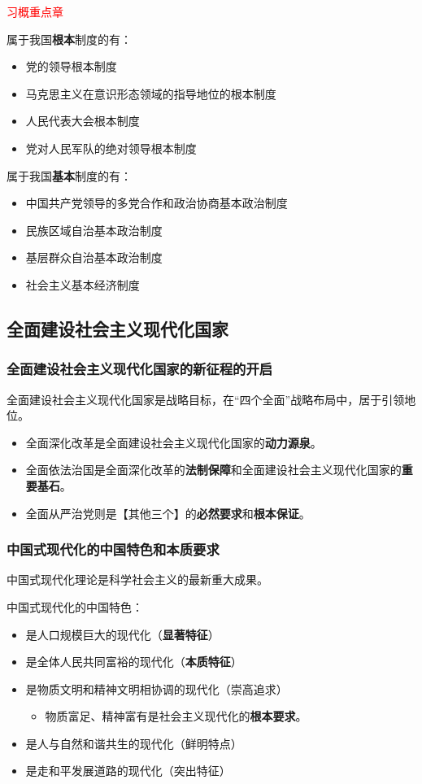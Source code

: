 \documentclass[12pt, a4paper, oneside]{ctexart}
\begin{document}
\textcolor{red}{习概重点章}

属于我国\textbf{根本}制度的有：
\begin{itemize}
  \item 党的领导根本制度
  \item 马克思主义在意识形态领域的指导地位的根本制度
  \item 人民代表大会根本制度
  \item 党对人民军队的绝对领导根本制度
\end{itemize}

属于我国\textbf{基本}制度的有：
\begin{itemize}
  \item 中国共产党领导的多党合作和政治协商基本政治制度
  \item 民族区域自治基本政治制度
  \item 基层群众自治基本政治制度
  \item 社会主义基本经济制度
\end{itemize}

\subsection{全面建设社会主义现代化国家}

\subsubsection{全面建设社会主义现代化国家的新征程的开启}

全面建设社会主义现代化国家是战略目标，在“四个全面”战略布局中，居于引领地位。
\begin{itemize}
  \item 全面深化改革是全面建设社会主义现代化国家的\textbf{动力源泉}。
  \item 全面依法治国是全面深化改革的\textbf{法制保障}和全面建设社会主义现代化国家的\textbf{重要基石}。
  \item 全面从严治党则是【其他三个】的\textbf{必然要求}和\textbf{根本保证}。
\end{itemize}

\subsubsection{中国式现代化的中国特色和本质要求}

中国式现代化理论是科学社会主义的最新重大成果。

中国式现代化的中国特色：
\begin{itemize}
  \item 是人口规模巨大的现代化（\textbf{显著特征}）
  \item 是全体人民共同富裕的现代化（\textbf{本质特征}）
  \item 是物质文明和精神文明相协调的现代化（崇高追求）
  \begin{itemize}
    \item 物质富足、精神富有是社会主义现代化的\textbf{根本要求}。
  \end{itemize}
  \item 是人与自然和谐共生的现代化（鲜明特点）
  \item 是走和平发展道路的现代化（突出特征）
\end{itemize}
\end{document}
